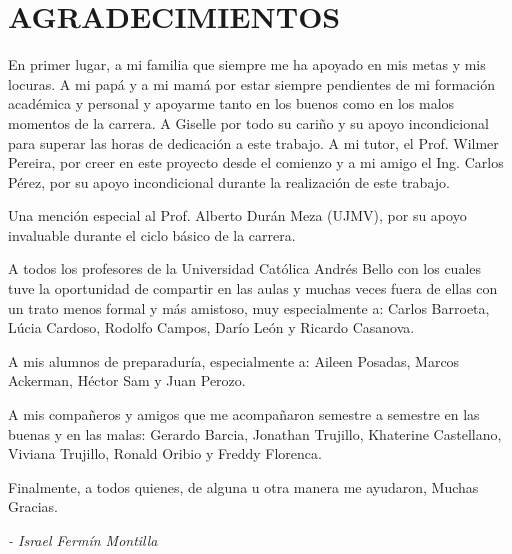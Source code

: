 \chapter*{AGRADECIMIENTOS}

En primer lugar, a mi familia que siempre me ha apoyado en mis metas y mis locuras. A mi papá y a mi mamá por estar siempre pendientes de mi formación académica y personal y apoyarme tanto en los buenos como en los malos momentos de la carrera. A Giselle por todo su cariño y su apoyo incondicional para superar las horas de dedicación a este trabajo. A mi tutor, el Prof. Wilmer Pereira, por creer en este proyecto desde el comienzo y a mi amigo el Ing. Carlos Pérez, por su apoyo incondicional durante la realización de este trabajo.

Una mención especial al Prof. Alberto Durán Meza (UJMV), por su apoyo invaluable durante el ciclo básico de la carrera.

A todos los profesores de la Universidad Católica Andrés Bello con los cuales tuve la oportunidad de compartir en las aulas y muchas veces fuera de ellas con un trato menos formal y más amistoso, muy especialmente a: Carlos Barroeta, Lúcia Cardoso, Rodolfo Campos, Darío León y Ricardo Casanova. 

A mis alumnos de preparaduría, especialmente a: Aileen Posadas, Marcos Ackerman, Héctor Sam y Juan Perozo.

A mis compañeros y amigos que me acompañaron semestre a semestre en las buenas y en las malas: Gerardo Barcia, Jonathan Trujillo, Khaterine Castellano, Viviana Trujillo, Ronald Oribio y Freddy Florenca.

Finalmente, a todos quienes, de alguna u otra manera me ayudaron,
Muchas Gracias.

\begin{flushright}
\textit{- Israel Fermín Montilla}
\end{flushright}
